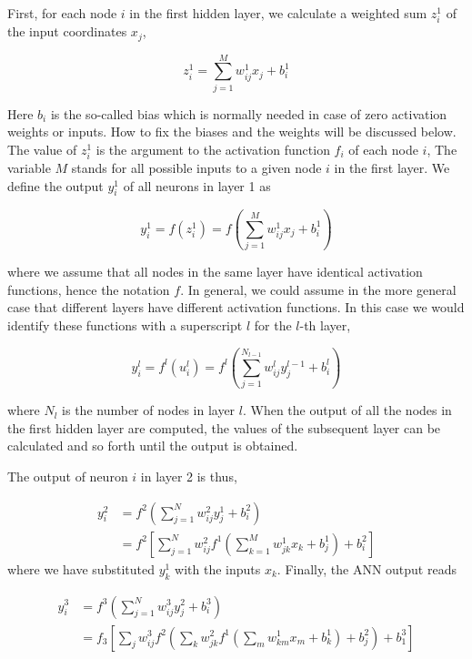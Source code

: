 First, for each node $i$ in the first hidden layer, we calculate a weighted sum $z_i^1$ of the input coordinates $x_j$,

\begin{equation} z_i^1 = \sum_{j=1}^{M} w_{ij}^1 x_j + b_i^1
\end{equation}

Here $b_i$ is the so-called bias which is normally needed in
case of zero activation weights or inputs. How to fix the biases and
the weights will be discussed below.  The value of $z_i^1$ is the
argument to the activation function $f_i$ of each node $i$, The
variable $M$ stands for all possible inputs to a given node $i$ in the
first layer.  We define  the output $y_i^1$ of all neurons in layer 1 as

\begin{equation}
 y_i^1 = f(z_i^1) = f\left(\sum_{j=1}^M w_{ij}^1 x_j  + b_i^1\right)
 \label{outputLayer1}
\end{equation}

where we assume that all nodes in the same layer have identical
activation functions, hence the notation $f$. In general, we could assume in the more general case that different layers have different activation functions.
In this case we would identify these functions with a superscript $l$ for the $l$-th layer,

\begin{equation}
 y_i^l = f^l(u_i^l) = f^l\left(\sum_{j=1}^{N_{l-1}} w_{ij}^l y_j^{l-1} + b_i^l\right)
 \label{generalLayer}
\end{equation}

where $N_l$ is the number of nodes in layer $l$. When the output of
all the nodes in the first hidden layer are computed, the values of
the subsequent layer can be calculated and so forth until the output
is obtained.

The output of neuron $i$ in layer 2 is thus,

\begin{align}
 y_i^2 &= f^2\left(\sum_{j=1}^N w_{ij}^2 y_j^1 + b_i^2\right) \\
 &= f^2\left[\sum_{j=1}^N w_{ij}^2f^1\left(\sum_{k=1}^M w_{jk}^1 x_k + b_j^1\right) + b_i^2\right]
 \label{outputLayer2}
\end{align}
where we have substituted $y_k^1$ with the inputs $x_k$. Finally, the ANN output reads

\begin{align}
 y_i^3 &= f^3\left(\sum_{j=1}^N w_{ij}^3 y_j^2 + b_i^3\right) \\
 &= f_3\left[\sum_{j} w_{ij}^3 f^2\left(\sum_{k} w_{jk}^2 f^1\left(\sum_{m} w_{km}^1 x_m + b_k^1\right) + b_j^2\right)
  + b_1^3\right]
\end{align}

